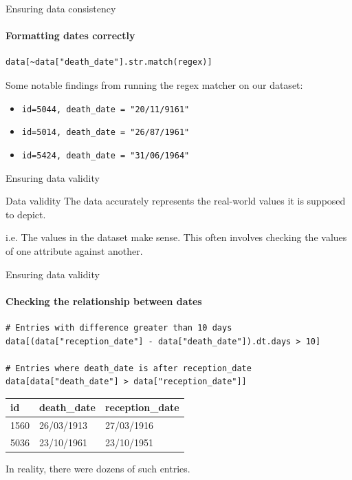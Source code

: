 \documentclass[]{beamer}
\begin{document}
\begin{frame}[fragile]{Ensuring data consistency}
	\framesubtitle{Formatting dates correctly}
	\begin{lstlisting}
data[~data["death_date"].str.match(regex)]
	\end{lstlisting}
	\vspace{1em}
	Some notable findings from running the regex matcher on our dataset:

	\begin{itemize}
		\item \pause \texttt{id=5044, death\_date = "20/11/9161"}
		\item \pause \texttt{id=5014, death\_date = "26/87/1961"}
		\item \pause \texttt{id=5424, death\_date = "31/06/1964"}
	\end{itemize}

\end{frame}

\begin{frame}[fragile]{Ensuring data validity}

	\begin{block}{Data validity}
		The data accurately represents the real-world values it is supposed to depict.
	\end{block}
	i.e. The values in the dataset make sense. This often involves checking the values of one attribute against another.

\end{frame}

\begin{frame}[fragile]{Ensuring data validity}
	\framesubtitle{Checking the relationship between dates}

	\begin{lstlisting}
# Entries with difference greater than 10 days
data[(data["reception_date"] - data["death_date"]).dt.days > 10]

# Entries where death_date is after reception_date
data[data["death_date"] > data["reception_date"]]

	\end{lstlisting}

	\begin{table}[]
		\begin{tabular}{lll}
		\toprule
		id   & death\_date & reception\_date \\ \midrule
		1560 & 26/03/1913  & 27/03/1916      \\
		5036 & 23/10/1961  & 23/10/1951		 \\
		\bottomrule
		\end{tabular}
	\end{table}
	In reality, there were dozens of such entries.	
\end{frame}
\end{document}
